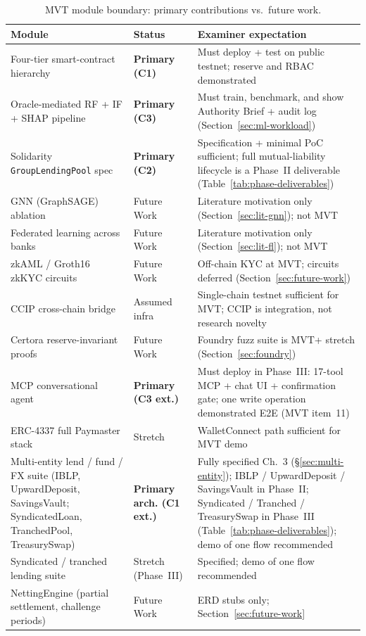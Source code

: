 \documentclass[12pt,a4paper]{report}
\newcommand{\tableheadcolor}{\rowcolor{TableHeadBg}}
\begin{document}
\begin{table}[H]
\centering
\caption[MVT module boundary: primary contributions vs.\ future work]{MVT module boundary: primary contributions vs.\ future work.}
\label{tab:contributions-vs-future}
\begin{tabular}{p{4.2cm}p{2.2cm}p{7.8cm}}
\toprule
\tableheadcolor
\textbf{Module} & \textbf{Status} & \textbf{Examiner expectation} \\
\midrule
Four-tier smart-contract hierarchy & \textbf{Primary (C1)} & Must deploy + test on public testnet; reserve and RBAC demonstrated \\
Oracle-mediated RF + IF + SHAP pipeline & \textbf{Primary (C3)} & Must train, benchmark, and show Authority Brief + audit log (Section~\ref{sec:ml-workload}) \\
Solidarity \texttt{GroupLendingPool} spec & \textbf{Primary (C2)} & Specification + minimal PoC sufficient; full mutual-liability lifecycle is a Phase~II deliverable (Table~\ref{tab:phase-deliverables}) \\
GNN (GraphSAGE) ablation & Future Work & Literature motivation only (Section~\ref{sec:lit-gnn}); not MVT \\
Federated learning across banks & Future Work & Literature motivation only (Section~\ref{sec:lit-fl}); not MVT \\
zkAML / Groth16 zkKYC circuits & Future Work & Off-chain KYC at MVT; circuits deferred (Section~\ref{sec:future-work}) \\
CCIP cross-chain bridge & Assumed infra & Single-chain testnet sufficient for MVT; CCIP is integration, not research novelty \\
Certora reserve-invariant proofs & Future Work & Foundry fuzz suite is MVT+ stretch (Section~\ref{sec:foundry}) \\
MCP conversational agent & \textbf{Primary (C3 ext.)} & Must deploy in Phase~III: 17-tool MCP + chat UI + confirmation gate; one write operation demonstrated E2E (MVT item~11) \\
ERC-4337 full Paymaster stack & Stretch & WalletConnect path sufficient for MVT demo \\
Multi-entity lend / fund / FX suite (IBLP, UpwardDeposit, SavingsVault; SyndicatedLoan, TranchedPool, TreasurySwap) & \textbf{Primary arch. (C1 ext.)} & Fully specified Ch.~3 (\S\ref{sec:multi-entity}); IBLP / UpwardDeposit / SavingsVault in Phase~II; Syndicated / Tranched / TreasurySwap in Phase~III (Table~\ref{tab:phase-deliverables}); demo of one flow recommended \\
Syndicated / tranched lending suite & Stretch (Phase~III) & Specified; demo of one flow recommended \\
NettingEngine (partial settlement, challenge periods) & Future Work & ERD stubs only; Section~\ref{sec:future-work} \\
\bottomrule
\end{tabular}
\end{table}
\end{document}
